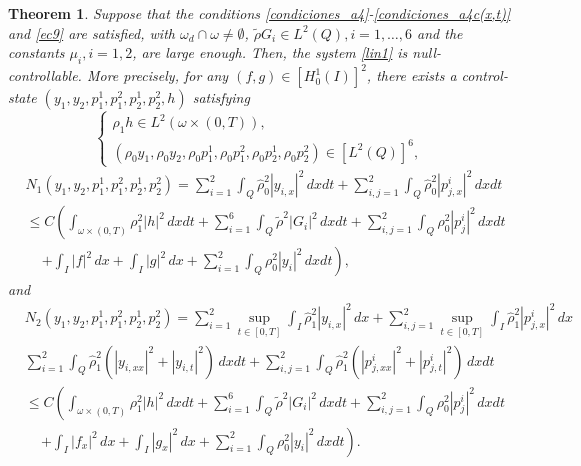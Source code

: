 \documentclass[11pt,a4paper]{amsart}
\numberwithin{equation}{section}
\newtheorem{theorem}{Theorem}[section]
\begin{document}
\begin{theorem} 
\label{teo:linearized_control}
 Suppose that the conditions \eqref{condiciones_a4}-\eqref{condiciones_a4c(x,t)} and  \eqref{ec9} are satisfied,  with $\omega_d\cap \omega\neq \emptyset$, $\tilde{\rho} G_i\in L^2(Q), i=1,\ldots,6$ and the constants $\mu_i, i=1,2$, are large enough. Then,  the system \eqref{lin1} is null-controllable.  More precisely, for any $(f, g) \in  [H_0^1(I)]^2$, there exists a control-state $(y_1, y_2,p_1^1,p_1^2,p_2^1,p_2^2,h)$ satisfying
\begin{equation}\label{est-linear1}
    \begin{cases}
        \rho_1 h \in L^2(\omega\times(0,T)),\\
        \left(\rho_0 y_1, \rho_0 y_2, \rho_0 p_1^1, \rho_0 p_1^2, \rho_0 p_2^1,\rho_0 p_2^2\right) \in [L^2(Q)]^6,
    \end{cases}
\end{equation}    
\begin{equation}\label{est-linear2}
    \begin{split}
&\displaystyle  N_1(y_1, y_2,p_1^1,p_1^2,p_2^1,p_2^2) =\sum^{2}_{i=1}\int_{Q} \hat{\rho}^{2}_{0}| y_{i,x}|^{2}\,dxdt+\sum^{2}_{i,j=1}\int_{Q}\hat{\rho}^{2}_{0}| p^{i}_{j,x}|^{2}\,dxdt\\
&\displaystyle \leq C\left(   \int_{\omega\times(0,T)}\rho^{2}_{1}|h|^{2}\,dxdt+\sum^{6}_{i=1}\int_{Q}\tilde{\rho}^{2}|G_{i}|^{2}\,dxdt+\sum^{2}_{i,j=1}\int_{Q}\rho^{2}_{0}|p^{i}_{j}|^{2}\,dxdt \right.\\
&\,\,\,\,\,\,\,\left.+\int_{I}|f|^{2}\,dx+\int_{I}|g|^{2}\,dx+\sum^{2}_{i=1}\int_{Q}\rho^{2}_{0}|y_{i}|^{2}\,dxdt \right),
\end{split}
\end{equation}and
\begin{equation}\label{est-linear3}
\begin{split}
&\displaystyle  N_2(y_1, y_2,p_1^1,p_1^2,p_2^1,p_2^2) =\sum^{2}_{i=1}\sup_{t\in [0,T]}\int_{I} \hat{\rho}^{2}_{1}| y_{i,x}|^{2}\,dx+\sum^{2}_{i,j=1}\sup_{t\in [0,T]}\int_{I}\hat{\rho}^{2}_{1}| p^{i}_{j,x}|^{2}\,dx\\
& \sum^{2}_{i=1}\int_{Q}\hat{\rho}^{2}_{1}(| y_{i,xx}|^{2}+|y_{i,t}|^{2})\,dxdt
+ \sum^{2}_{i,j=1}\int_{Q}\hat{\rho}^{2}_{1}(| p^{i}_{j,xx}|^{2}+|p^{i}_{j,t}|^{2})\,dxdt\\
&\displaystyle \leq C\left(   \int_{\omega\times(0,T)}\rho^{2}_{1}|h|^{2}\,dxdt+\sum^{6}_{i=1}\int_{Q}\tilde{\rho}^{2}|G_{i}|^{2}\,dxdt+\sum^{2}_{i,j=1}\int_{Q}\rho^{2}_{0}|p^{i}_{j}|^{2}\,dxdt \right.\\
&\,\,\,\,\,\,\,\left.+\int_{I}|f_{x}|^{2}\,dx+\int_{I}|g_{x}|^{2}\,dx+\sum^{2}_{i=1}\int_{Q}\rho^{2}_{0}|y_{i}|^{2}\,dxdt \right).
\end{split}
\end{equation}

\end{theorem}
\end{document}
